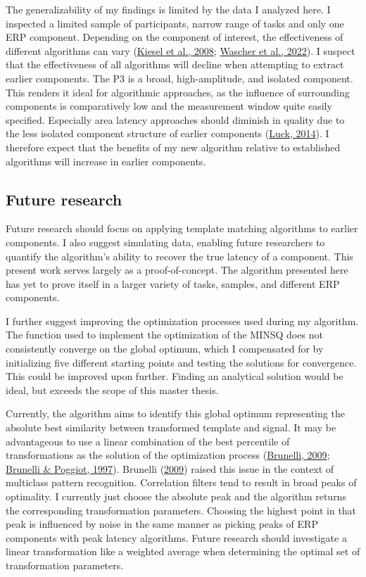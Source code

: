 \documentclass[
  man]{apa7}
\begin{document}
The generalizability of my findings is limited by the data I analyzed here. I inspected a limited sample of participants, narrow range of tasks and only one ERP component. Depending on the component of interest, the effectiveness of different algorithms can vary (\protect\hyperlink{ref-kiesel2008measurement}{Kiesel et al., 2008}; \protect\hyperlink{ref-wascher2022mental}{Wascher et al., 2022}). I suspect that the effectiveness of all algorithms will decline when attempting to extract earlier components. The P3 is a broad, high-amplitude, and isolated component. This renders it ideal for algorithmic approaches, as the influence of surrounding components is comparatively low and the measurement window quite easily specified. Especially area latency approaches should diminish in quality due to the less isolated component structure of earlier components (\protect\hyperlink{ref-luck2014introduction}{Luck, 2014}). I therefore expect that the benefits of my new algorithm relative to established algorithms will increase in earlier components.

\hypertarget{future-research}{%
\subsection{Future research}\label{future-research}}

Future research should focus on applying template matching algorithms to earlier components. I also suggest simulating data, enabling future researchers to quantify the algorithm's ability to recover the true latency of a component. This present work serves largely as a proof-of-concept. The algorithm presented here has yet to prove itself in a larger variety of tasks, samples, and different ERP components.

I further suggest improving the optimization processes used during my algorithm. The function used to implement the optimization of the MINSQ does not consistently converge on the global optimum, which I compensated for by initializing five different starting points and testing the solutions for convergence. This could be improved upon further. Finding an analytical solution would be ideal, but exceeds the scope of this master thesis.

Currently, the algorithm aims to identify this global optimum representing the absolute best similarity between transformed template and signal. It may be advantageous to use a linear combination of the best percentile of transformations as the solution of the optimization process (\protect\hyperlink{ref-brunelli2009template}{Brunelli, 2009}; \protect\hyperlink{ref-brunelli1997template}{Brunelli \& Poggiot, 1997}). Brunelli (\protect\hyperlink{ref-brunelli2009template}{2009}) raised this issue in the context of multiclass pattern recognition. Correlation filters tend to result in broad peaks of optimality. I currently just choose the absolute peak and the algorithm returns the corresponding transformation parameters. Choosing the highest point in that peak is influenced by noise in the same manner as picking peaks of ERP components with peak latency algorithms. Future research should investigate a linear transformation like a weighted average when determining the optimal set of transformation parameters.
\end{document}
